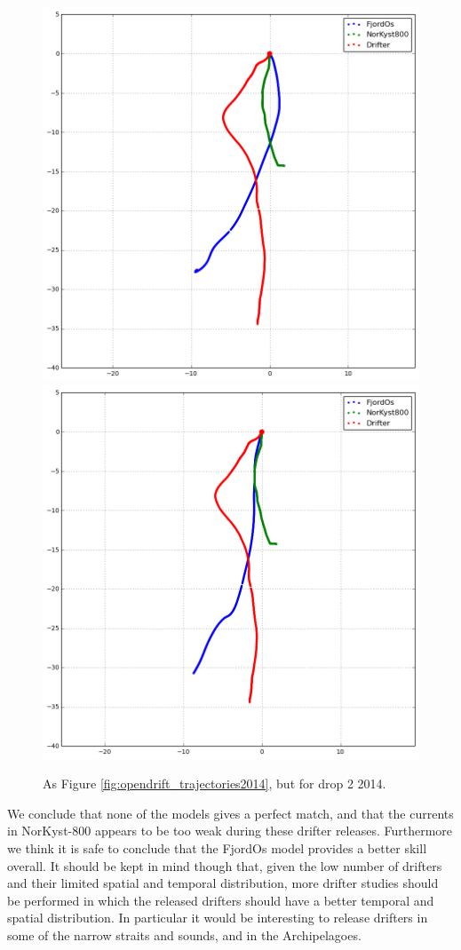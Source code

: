 \begin{figure}[htb]
	\centerline{
		\includegraphics*[width=.5\textwidth]{Figurer/opendrift/skillscore/2014drop2i1}
		\includegraphics*[width=.5\textwidth]{Figurer/opendrift/skillscore/2014drop2i1_24h}
		}
	\caption{\small As Figure \ref{fig:opendrift_trajectories2014}, but for drop 2 2014.}
	\label{fig:opendrift_trajectories2014a}
\end{figure}

We conclude that none of the models gives a perfect match, and that the currents in NorKyst-800 appears to be too weak during these drifter releases. Furthermore we think it is safe to conclude that the FjordOs model provides a better skill overall. It should be kept in mind though that, given the low number of drifters and their limited spatial and temporal distribution, more drifter studies should be performed in which the released drifters should have a better temporal and spatial distribution. In particular it would be interesting to release drifters in some of the narrow straits and sounds, and in the Archipelagoes.
